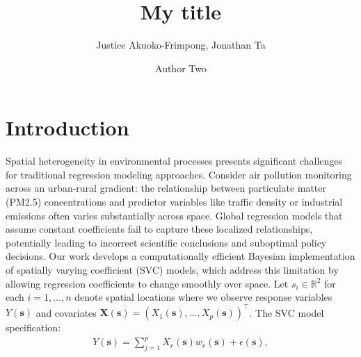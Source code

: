 



\addtolength{\oddsidemargin}{-.5in}%
\addtolength{\evensidemargin}{-1in}%
\addtolength{\textwidth}{1in}%
\addtolength{\textheight}{1.7in}%
\addtolength{\topmargin}{-1in}%



\def\spacingset#1{\renewcommand{\baselinestretch}%
{#1}\small\normalsize} \spacingset{1}

\date{}

\newcommand{\footremember}[2]{%
    \footnote{#2}
    \newcounter{#1}
    \setcounter{#1}{\value{footnote}}%
}
\newcommand{\footrecall}[1]{%
    \footnotemark[\value{#1}]%
} 

\newcommand{\bbR}{\mathbb{R}}
\newcommand{\bX}{\boldsymbol{X}}
\newcommand{\bs}{\boldsymbol{s}}

\newcommand{\mytitle}{My title}  

\title{\bf \mytitle}
\author{Justice Akuoko-Frimpong, Jonathan Ta \and Author Two }

\maketitle


\spacingset{1.9} %


\section{Introduction}
\label{sec:intro}
Spatial heterogeneity in environmental processes presents significant challenges for traditional regression modeling approaches. Consider air pollution monitoring across an urban-rural gradient: the relationship between particulate matter (PM2.5) concentrations and predictor variables like traffic density or industrial emissions often varies substantially across space. Global regression models that assume constant coefficients fail to capture these localized relationships, potentially leading to incorrect scientific conclusions and suboptimal policy decisions.
Our work develops a computationally efficient Bayesian implementation of spatially varying coefficient (SVC) models, which address this limitation by allowing regression coefficients to change smoothly over space. Let $s_i \in \bbR^2$ for each $i = 1, \dots, n$ denote spatial locations where we observe response variables $Y(\bs)$ and covariates $\bX(\bs) = (X_1(\bs), \dots, X_p(\bs))^\top$. The SVC model specification:
\begin{align*}
    Y(\bs) = \sum_{j=1}^p X_r(\bs)w_r(\bs) + \epsilon(\bs),
\end{align*}

